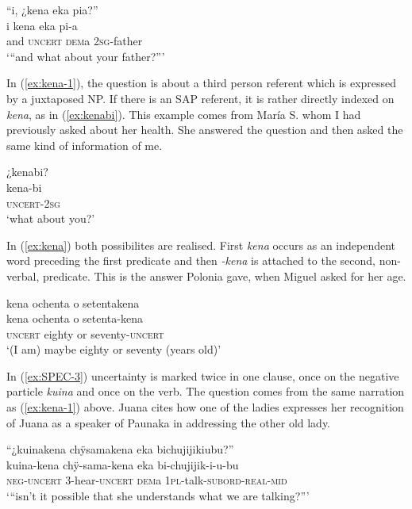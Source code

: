 \ea\label{ex:kena-1}
\begingl 
\glpreamble “i, ¿kena eka pia?”\\
\gla i kena eka pi-a\\ 
\glb and \textsc{uncert} \textsc{dem}a 2\textsc{sg}-father\\ 
\glft ‘“and what about your father?”’\\ 
\endgl
\trailingcitation{[jxx-p120515l-1.124]}
\xe
 
In (\ref{ex:kena-1}), the question is about a third person referent which is expressed by a juxtaposed NP. If there is an SAP referent, it is rather directly indexed on \textit{kena}, as in (\ref{ex:kenabi}). This example comes from María S. whom I had previously asked about her health. She answered the question and then asked the same kind of information of me.

\ea\label{ex:kenabi}
\begingl
\glpreamble ¿kenabi?\\
\gla kena-bi\\
\glb \textsc{uncert}-2\textsc{sg}\\
\glft ‘what about you?’
\endgl
\trailingcitation{[rmx-e150922l.014]}
\xe
{}

In (\ref{ex:kena}) both possibilites are realised. First \textit{kena} occurs as an independent word preceding the first predicate and then \textit{-kena} is attached to the second, non-verbal, predicate. This is the answer Polonia gave, when Miguel asked for her age.

\ea\label{ex:kena}
\begingl 
\glpreamble kena ochenta o setentakena\\
\gla kena ochenta o setenta-kena\\ 
\glb \textsc{uncert} eighty or seventy-\textsc{uncert}\\ 
\glft ‘(I am) maybe eighty or seventy (years old)’\\ 
\endgl
\trailingcitation{[mty-p110906l.104]}
\xe

In (\ref{ex:SPEC-3}) uncertainty is marked twice in one clause, once on the negative particle \textit{kuina} and once on the verb. The question comes from the same narration as (\ref{ex:kena-1}) above. Juana cites how one of the ladies expresses her recognition of Juana as a speaker of Paunaka in addressing the other old lady. 

\ea\label{ex:SPEC-3}
\begingl 
\glpreamble “¿kuinakena chÿsamakena eka bichujijikiubu?”\\
\gla  kuina-kena chÿ-sama-kena eka bi-chujijik-i-u-bu\\ 
\glb \textsc{neg}-\textsc{uncert} 3-hear-\textsc{uncert} \textsc{dem}a 1\textsc{pl}-talk-\textsc{subord}-\textsc{real}-\textsc{mid}\\ 
\glft ‘“isn’t it possible that she understands what we are talking?”’\\ 
\endgl
\trailingcitation{[jxx-p120515l-1.087]}
\xe


